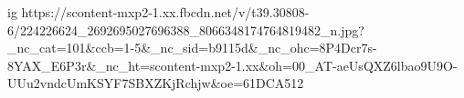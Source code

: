  
 
 
 
 

\ifcmt
  ig https://scontent-mxp2-1.xx.fbcdn.net/v/t39.30808-6/224226624_2692695027696388_8066348174764819482_n.jpg?_nc_cat=101&ccb=1-5&_nc_sid=b9115d&_nc_ohc=8P4Dcr7s-8YAX_E6P3r&_nc_ht=scontent-mxp2-1.xx&oh=00_AT-aeUsQXZ6lbao9U9O-UUu2vndcUmKSYF7SBXZKjRchjw&oe=61DCA512
\fi
